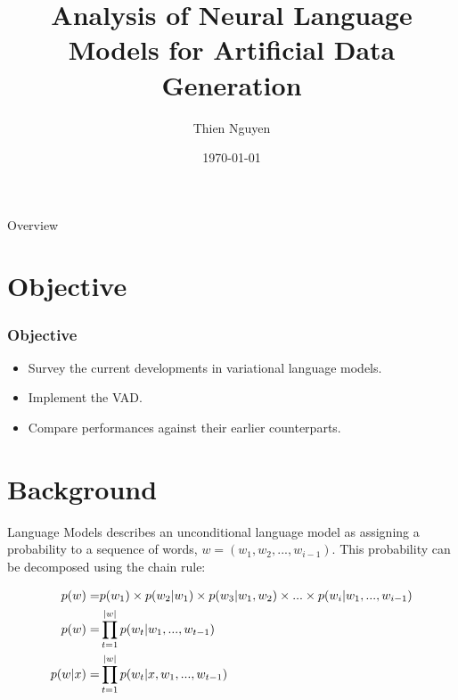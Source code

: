 \documentclass[aspectratio=169, 11pt]{beamer}
\title{Analysis of Neural Language Models for Artificial Data Generation}
\author{Thien Nguyen}
\date{\today}
\begin{document}

\frame{\titlepage}

\begin{frame}{Overview}
\tableofcontents
\end{frame}
  
\section{Objective} 
\begin{frame}
  \frametitle{Objective}
  \begin{itemize}
    \item Survey the current developments in variational language models.
    \item Implement the VAD.
    \item Compare performances against their earlier counterparts.
  \end{itemize}
\end{frame}

\section{Background}
\begin{frame}{Language Models}
    \cite{dyer_conditional_2017} describes an unconditional language model as assigning a probability to a sequence of words,  $w = (w_1, w_2, ..., w_{i-1})$. This probability can be decomposed using the chain rule:

  \begin{align}
    p(w) =& \space p(w_1) \times p(w_2|w_1) \times p(w_3|w_1, w_2) \times ... \times p(w_i|w_1, ..., w_{i-1}) \\
    p(w) =& \prod^{|w|}_{t=1}p(w_t|w_1, ..., w_{t-1}) \\
    p(\boldmath{w}|x) = &{} \prod^{|w|}_{t=1}p(w_t|x,w_1, ..., w_{t-1})
  \end{align}
\end{frame}

\end{document}
